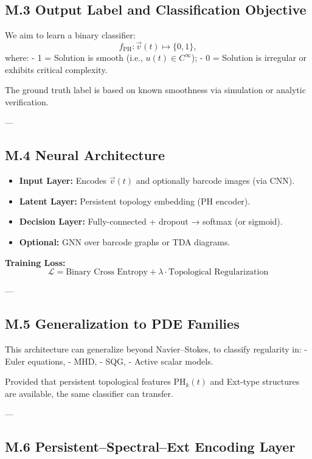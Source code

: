 \documentclass[11pt]{article}
\theoremstyle{definition}
\begin{document}
\subsection*{M.3 Output Label and Classification Objective}

We aim to learn a binary classifier:
\[
f_{\mathrm{PH}}: \vec{v}(t) \mapsto \{0,1\},
\]
where:
- 1 = Solution is smooth (i.e., \( u(t) \in C^\infty \));
- 0 = Solution is irregular or exhibits critical complexity.

The ground truth label is based on known smoothness via simulation or analytic verification.

---

\subsection*{M.4 Neural Architecture}

\begin{itemize}
  \item \textbf{Input Layer:} Encodes \( \vec{v}(t) \) and optionally barcode images (via CNN).
  \item \textbf{Latent Layer:} Persistent topology embedding (PH encoder).
  \item \textbf{Decision Layer:} Fully-connected + dropout → softmax (or sigmoid).
  \item \textbf{Optional:} GNN over barcode graphs or TDA diagrams.
\end{itemize}

\textbf{Training Loss:}
\[
\mathcal{L} = \text{Binary Cross Entropy} + \lambda \cdot \text{Topological Regularization}
\]

---

\subsection*{M.5 Generalization to PDE Families}

This architecture can generalize beyond Navier–Stokes, to classify regularity in:
- Euler equations,
- MHD,
- SQG,
- Active scalar models.

Provided that persistent topological features \( \mathrm{PH}_k(t) \) and Ext-type structures are available, the same classifier can transfer.

---

\subsection*{M.6 Persistent–Spectral–Ext Encoding Layer}
\end{document}
